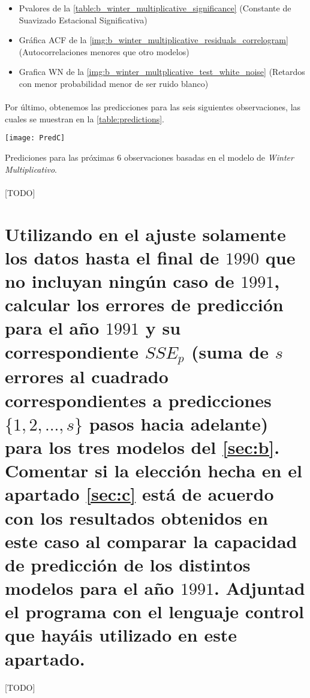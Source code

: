 \documentclass[a4paper, spanish]{article}
\begin{document}
    \begin{itemize}
      \item Pvalores de la \autoref{table:b_winter_multiplicative_significance} (Constante de Suavizado Estacional Significativa)
      \item Gráfica ACF de la \autoref{img:b_winter_multiplicative_residuals_correlogram} (Autocorrelaciones menores que otro modelos)
      \item Grafica WN de la \autoref{img:b_winter_multplicative_test_white_noise} (Retardos con menor probabilidad menor de ser ruido blanco)
    \end{itemize}

    \paragraph{}
    Por último, obtenemos las predicciones para las seis siguientes observaciones, las cuales se muestran en la \autoref{table:predictions}.

    \begin{table}[htb!]
      \centering
      \texttt{[image: PredC]}
      \caption{Prediciones para las próximas $6$ observaciones basadas en el modelo de \emph{Winter Multiplicativo}.}
      \label{table:predictions}
    \end{table}

    \paragraph{}
    [TODO]

  \section{Utilizando en el ajuste solamente los datos hasta el final de $1990$ que no incluyan ningún caso de $1991$, calcular los errores de predicción para el año $1991$ y su correspondiente $SSE_p$ (suma de $s$ errores al cuadrado correspondientes a predicciones $\{1, 2, ..., s\}$ pasos hacia adelante) para los tres modelos del \autoref{sec:b}. Comentar si la elección hecha en el apartado \autoref{sec:c} está de acuerdo con los resultados obtenidos en este caso al comparar la capacidad de predicción de los distintos modelos para el año $1991$. Adjuntad el programa con el lenguaje control que hayáis utilizado en este apartado.}
  \label{sec:d}

    \paragraph{}
    [TODO]
\end{document}
